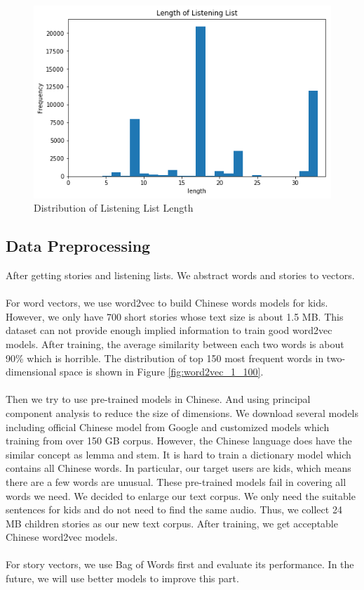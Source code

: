 \documentclass[sigconf]{acmart}
\begin{document}
\begin{figure}
\includegraphics[width = .45\textwidth]{distribution_of_listening_list_length.png}
\caption{Distribution of Listening List Length}
\label{fig:dlll}
\end{figure}

\subsection{Data Preprocessing}
After getting stories and listening lists. We abstract words and stories to vectors.
\\\\
For word vectors, we use word2vec to build Chinese words models for kids. However, we only have 700 short stories whose text size is about 1.5 MB. This dataset can not provide enough implied information to train good word2vec models. After training, the average similarity between each two words is about 90\% which is horrible. The distribution of top 150 most frequent words in two-dimensional space is shown in Figure \ref{fig:word2vec_1_100}.
\\\\
Then we try to use pre-trained models in Chinese. And using principal component analysis to reduce the size of dimensions. We download several models including official Chinese model from Google and customized models which training from over 150 GB corpus. However, the Chinese language does have the similar concept as lemma and stem. It is hard to train a dictionary model which contains all Chinese words. In particular, our target users are kids, which means there are a few words are unusual. These pre-trained models fail in covering all words we need. We decided to enlarge our text corpus. We only need the suitable sentences for kids and do not need to find the same audio. Thus, we collect 24 MB children stories as our new text corpus. After training, we get acceptable Chinese word2vec models.
\\\\
For story vectors, we use Bag of Words first and evaluate its performance. In the future, we will use better models to improve this part.
\end{document}
